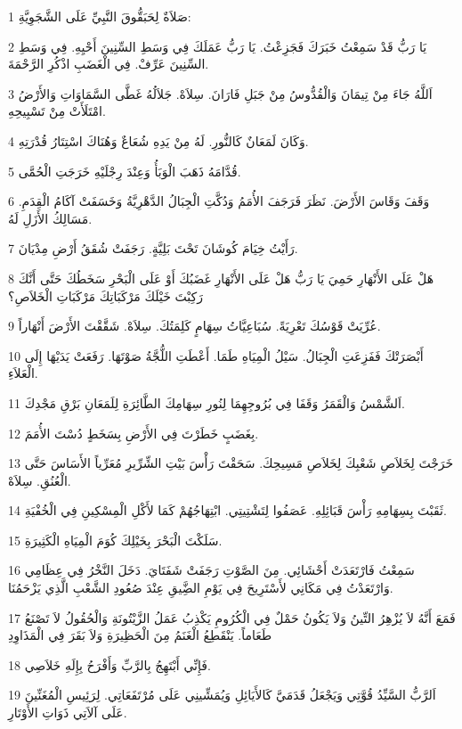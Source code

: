 \par 1 صَلاَةٌ لِحَبَقُّوقَ النَّبِيِّ عَلَى الشَّجَوِيَّةِ:
\par 2 يَا رَبُّ قَدْ سَمِعْتُ خَبَرَكَ فَجَزِعْتُ. يَا رَبُّ عَمَلَكَ فِي وَسَطِ السِّنِينَ أَحْيِهِ. فِي وَسَطِ السِّنِينَ عَرِّفْ. فِي الْغَضَبِ اذْكُرِ الرَّحْمَةَ.
\par 3 اَللَّهُ جَاءَ مِنْ تِيمَانَ وَالْقُدُّوسُ مِنْ جَبَلِ فَارَانَ. سِلاَهْ. جَلاَلُهُ غَطَّى السَّمَاوَاتِ وَالأَرْضُ امْتَلَأَتْ مِنْ تَسْبِيحِهِ.
\par 4 وَكَانَ لَمَعَانٌ كَالنُّورِ. لَهُ مِنْ يَدِهِ شُعَاعٌ وَهُنَاكَ اسْتِتَارُ قُدْرَتِهِ.
\par 5 قُدَّامَهُ ذَهَبَ الْوَبَأُ وَعِنْدَ رِجْلَيْهِ خَرَجَتِ الْحُمَّى.
\par 6 وَقَفَ وَقَاسَ الأَرْضَ. نَظَرَ فَرَجَفَ الأُمَمُ وَدُكَّتِ الْجِبَالُ الدَّهْرِيَّةُ وَخَسَفَتْ آكَامُ الْقِدَمِ. مَسَالِكُ الأَزَلِ لَهُ.
\par 7 رَأَيْتُ خِيَامَ كُوشَانَ تَحْتَ بَلِيَّةٍ. رَجَفَتْ شُقَقُ أَرْضِ مِدْيَانَ.
\par 8 هَلْ عَلَى الأَنْهَارِ حَمِيَ يَا رَبُّ هَلْ عَلَى الأَنْهَارِ غَضَبُكَ أَوْ عَلَى الْبَحْرِ سَخَطُكَ حَتَّى أَنَّكَ رَكِبْتَ خَيْلَكَ مَرْكَبَاتِكَ مَرْكَبَاتِ الْخَلاَصِ؟
\par 9 عُرِّيَتْ قَوْسُكَ تَعْرِيَةً. سُبَاعِيَّاتُ سِهَامٍ كَلِمَتُكَ. سِلاَهْ. شَقَّقْتَ الأَرْضَ أَنْهَاراً.
\par 10 أَبْصَرَتْكَ فَفَزِعَتِ الْجِبَالُ. سَيْلُ الْمِيَاهِ طَمَا. أَعْطَتِ اللُّجَّةُ صَوْتَهَا. رَفَعَتْ يَدَيْهَا إِلَى الْعَلاَءِ.
\par 11 اَلشَّمْسُ وَالْقَمَرُ وَقَفَا فِي بُرُوجِهِمَا لِنُورِ سِهَامِكَ الطَّائِرَةِ لِلَمَعَانِ بَرْقِ مَجْدِكَ.
\par 12 بِغَضَبٍ خَطَرْتَ فِي الأَرْضِ بِسَخَطٍ دُسْتَ الأُمَمَ.
\par 13 خَرَجْتَ لِخَلاَصِ شَعْبِكَ لِخَلاَصِ مَسِيحِكَ. سَحَقْتَ رَأْسَ بَيْتِ الشِّرِّيرِ مُعَرِّياً الأَسَاسَ حَتَّى الْعُنُقِ. سِلاَهْ.
\par 14 ثَقَبْتَ بِسِهَامِهِ رَأْسَ قَبَائِلِهِ. عَصَفُوا لِتَشْتِيتِي. ابْتِهَاجُهُمْ كَمَا لأَكْلِ الْمِسْكِينِ فِي الْخُفْيَةِ.
\par 15 سَلَكْتَ الْبَحْرَ بِخَيْلِكَ كُوَمَ الْمِيَاهِ الْكَثِيرَةِ.
\par 16 سَمِعْتُ فَارْتَعَدَتْ أَحْشَائِي. مِنَ الصَّوْتِ رَجَفَتْ شَفَتَايَ. دَخَلَ النَّخْرُ فِي عِظَامِي وَارْتَعَدْتُ فِي مَكَانِي لأَسْتَرِيحَ فِي يَوْمِ الضَِّيقِ عِنْدَ صُعُودِ الشَّعْبِ الَّذِي يَزْحَمُنَا.
\par 17 فَمَعَ أَنَّهُ لاَ يُزْهِرُ التِّينُ وَلاَ يَكُونُ حَمْلٌ فِي الْكُرُومِ يَكْذِبُ عَمَلُ الزَّيْتُونَةِ وَالْحُقُولُ لاَ تَصْنَعُ طَعَاماً. يَنْقَطِعُ الْغَنَمُ مِنَ الْحَظِيرَةِ وَلاَ بَقَرَ فِي الْمَذَاوِدِ
\par 18 فَإِنِّي أَبْتَهِجُ بِالرَّبِّ وَأَفْرَحُ بِإِلَهِ خَلاَصِي.
\par 19 اَلرَّبُّ السَّيِّدُ قُوَّتِي وَيَجْعَلُ قَدَمَيَّ كَالأَيَائِلِ وَيُمَشِّينِي عَلَى مُرْتَفَعَاتِي. لِرَئِيسِ الْمُغَنِّينَ عَلَى آلاَتِي ذَوَاتِ الأَوْتَارِ.


